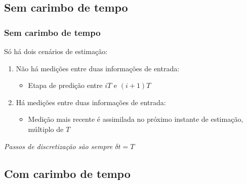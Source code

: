 \documentclass{beamer}
\renewcommand{\(}{\left(}
\renewcommand{\)}{\right)}
\renewcommand{\[}{\left[}
\renewcommand{\]}{\right]}
\begin{document}

\subsection{Sem carimbo de tempo} 

\begin{frame}
	\frametitle{Sem carimbo de tempo}
	
	Só há dois cenários de estimação:
	\vspace{0.25cm}
	
	\begin{enumerate}
		\item Não há medições entre duas informações de entrada:
		\begin{itemize}
			\item Etapa de predição entre $iT$ e $(i+1)T$
		\end{itemize}
		\vspace{0.25cm}
		\item Há medições entre duas informações de entrada:
		\begin{itemize}
			\item Medição mais recente é assimilada no próximo instante de estimação, múltiplo de $T$
		\end{itemize}
	\end{enumerate}
	
	\textit{Passos de discretização são sempre $\delta t = T$}

\end{frame}



\subsection{Com carimbo de tempo} 

\end{document}
